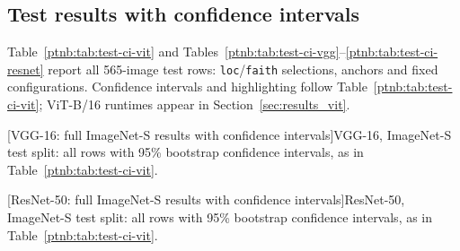 \begin{table}[htbp]
    \centering
    \caption[Validation selection on ViT-B/16, VGG-16 and ResNet-50]{ViT-B/16, VGG-16 and ResNet-50: validation rank-sums within each method, lower is better. Each pair reports localization and faithfulness rank-sums for the row selected by the named criterion (Section~\ref{ptnb:app:selection}); anchors are fixed reference configurations.}
    \label{ptnb:tab:val-selection-all}
\TableContent{
    \small
    \setlength{\tabcolsep}{3pt}
    
}%
\end{table}

\subsection{Test results with confidence intervals}\label{ptnb:app:test-ci}

Table~\ref{ptnb:tab:test-ci-vit} and Tables~\ref{ptnb:tab:test-ci-vgg}--\ref{ptnb:tab:test-ci-resnet} report all 565-image test rows: \texttt{loc}/\texttt{faith} selections, anchors and fixed configurations. Confidence intervals and highlighting follow Table~\ref{ptnb:tab:test-ci-vit}; ViT-B/16 runtimes appear in Section~\ref{sec:results_vit}.

\begin{center}
    \captionsetup{hypcap=false}
    [VGG-16: full ImageNet-S results with confidence intervals]{VGG-16, ImageNet-S test split: all rows with 95\% bootstrap confidence intervals,
    as in Table~\ref{ptnb:tab:test-ci-vit}.}
    \label{ptnb:tab:test-ci-vgg}
\end{center}
\captionsetup{hypcap=true}

\begin{center}
    \captionsetup{hypcap=false}
    [ResNet-50: full ImageNet-S results with confidence intervals]{ResNet-50, ImageNet-S test split: all rows with 95\% bootstrap confidence
    intervals, as in Table~\ref{ptnb:tab:test-ci-vit}.}
    \label{ptnb:tab:test-ci-resnet}
\end{center}
\captionsetup{hypcap=true}


